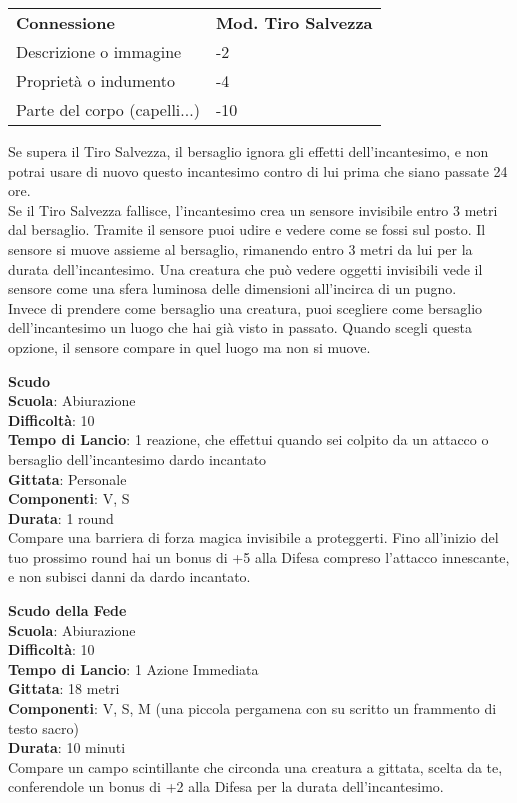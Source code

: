 \begin{multicols}{2}
\medskip

\begin{tabular}{ll}
	\toprule
\textbf{Connessione} & \textbf{Mod. Tiro Salvezza}\\
Descrizione o immagine &-2\\
Proprietà o indumento & -4\\
Parte del corpo (capelli...)&-10\\
\end{tabular}
\medskip

Se supera il Tiro Salvezza, il bersaglio ignora gli effetti dell'incantesimo, e non potrai usare di nuovo questo incantesimo contro di lui prima che siano passate 24 ore.\\
Se il Tiro Salvezza fallisce, l'incantesimo crea un sensore invisibile entro 3 metri dal bersaglio. Tramite il sensore puoi udire e vedere come se fossi sul posto. Il sensore si muove assieme al bersaglio, rimanendo entro 3 metri da lui per la durata dell'incantesimo. Una creatura che può  vedere oggetti invisibili vede il sensore come una sfera luminosa delle dimensioni  all'incirca di un pugno.\\
Invece di prendere come bersaglio una creatura, puoi scegliere come bersaglio dell'incantesimo un luogo che hai già visto in passato. Quando scegli questa opzione, il sensore compare in quel luogo ma non si muove. 

\medskip\textbf{Scudo}\\
\textbf{Scuola}: Abiurazione\\
\textbf{Difficoltà}:  10\\
\textbf{Tempo di Lancio}: 1 reazione, che effettui quando sei colpito da un attacco o bersaglio dell'incantesimo dardo incantato\\
\textbf{Gittata}: Personale\\
\textbf{Componenti}: V, S\\
\textbf{Durata}: 1 round\\
Compare una barriera di forza magica invisibile a proteggerti. Fino all'inizio del tuo prossimo round hai un bonus di +5 alla Difesa compreso l’attacco innescante, e non subisci danni da dardo incantato.

\medskip\textbf{Scudo della Fede}\\
\textbf{Scuola}: Abiurazione\\
\textbf{Difficoltà}:  10\\
\textbf{Tempo di Lancio}: 1 Azione Immediata\\
\textbf{Gittata}: 18 metri\\
\textbf{Componenti}: V, S, M (una piccola pergamena con su scritto un frammento di testo sacro)\\
\textbf{Durata}: 10 minuti\\
Compare un campo scintillante che circonda una creatura a gittata, scelta da te, conferendole un bonus di +2 alla Difesa per la durata dell'incantesimo.


\end{multicols}
